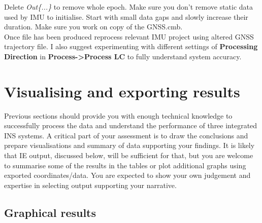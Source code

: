 \documentclass[11pt,fleqn]{book} %
\begin{document}
Delete \emph{Out\{...\}} to remove whole epoch. Make sure you don't remove static data used by IMU to initialise. Start with small data gaps and slowly increase their duration. Make sure you work on copy of the GNSS.cmb.\\

Once file has been produced reprocess relevant IMU project using altered GNSS trajectory file. I also suggest experimenting with different settings of \textbf{Processing Direction} in \textbf{Process->Process LC} to fully understand system accuracy.


\chapter{Visualising and exporting  results\label{sec:Exporting-final-results}}

Previous sections should provide you with enough technical knowledge to successfully process the data and understand the performance of three integrated INS systems. A critical part of your assessment is to draw the conclusions and prepare visualisations and summary of data supporting your findings. It is likely that IE output, discussed below, will be sufficient for that, but you are welcome to summarise some of the results in the tables or plot additional graphs using exported coordinates/data. You are expected to show your own judgement and expertise in selecting output supporting your narrative.

\section{Graphical results}
\end{document}
